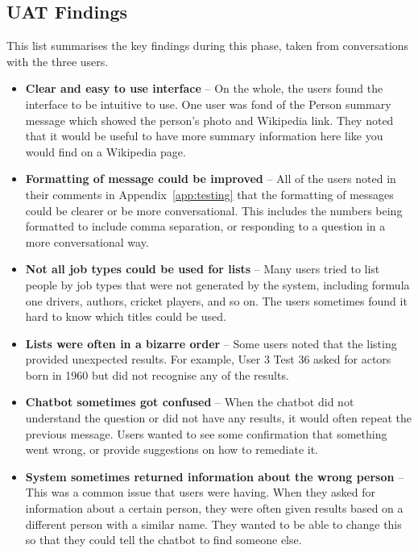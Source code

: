 \subsection{UAT Findings}
This list summarises the key findings during this phase, taken from conversations with the three users.
\begin{itemize}
	\item \textbf{Clear and easy to use interface} -- On the whole, the users found the interface to be intuitive to use. One user was fond of the Person summary message which showed the person's photo and Wikipedia link. They noted that it would be useful to have more summary information here like you would find on a Wikipedia page.
	\item \textbf{Formatting of message could be improved} -- All of the users noted in their comments in Appendix~\ref{app:testing} that the formatting of messages could be clearer or be more conversational. This includes the numbers being formatted to include comma separation, or responding to a question in a more conversational way.
	\item \textbf{Not all job types could be used for lists} -- Many users tried to list people by job types that were not generated by the system, including formula one drivers, authors, cricket players, and so on. The users sometimes found it hard to know which titles could be used.
	\item \textbf{Lists were often in a bizarre order} -- Some users noted that the listing provided unexpected results. For example, User 3 Test 36 asked for actors born in 1960 but did not recognise any of the results.
	\item \textbf{Chatbot sometimes got confused} -- When the chatbot did not understand the question or did not have any results, it would often repeat the previous message. Users wanted to see some confirmation that something went wrong, or provide suggestions on how to remediate it.
	\item \textbf{System sometimes returned information about the wrong person} -- This was a common issue that users were having. When they asked for information about a certain person, they were often given results based on a different person with a similar name. They wanted to be able to change this so that they could tell the chatbot to find someone else.
\end{itemize}

